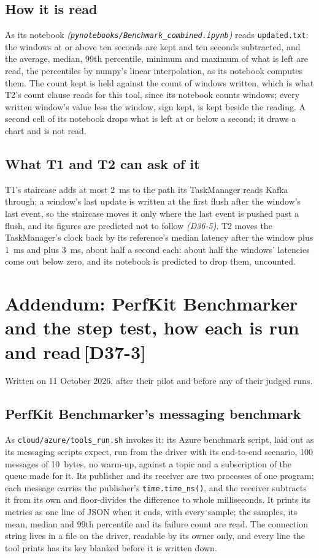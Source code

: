 \documentclass[11pt]{article}
\newcommand{\gl}[1]{{\color{soft}\itshape\small (#1)}}
\newcommand{\chgold}[1]{\,{\color{oldcol}\bfseries\footnotesize[#1]}}
\begin{document}
\subsection*{How it is read}
As its notebook \gl{\texttt{pynotebooks/Benchmark\_combined.ipynb}} reads \texttt{updated.txt}: the
windows at or above ten seconds are kept and ten seconds subtracted, and the average, median, 99th
percentile, minimum and maximum of what is left are read, the percentiles by numpy's linear
interpolation, as its notebook computes them. The count kept is held against the count of windows
written, which is what T2's count clause reads for this tool, since its notebook counts windows;
every written window's value less the window, sign kept, is kept beside the reading. A
second cell of its notebook drops what is left at or below a second; it draws a chart and is not
read.

\subsection*{What T1 and T2 can ask of it}
T1's staircase adds at most 2~ms to the path its TaskManager reads Kafka through; a window's last
update is written at the first flush after the window's last event, so the staircase moves it only
where the last event is pushed past a flush, and its figures are predicted not to follow
\gl{D36-5}. T2 moves the TaskManager's clock back by its reference's median latency after the window
plus 1~ms and plus 3~ms, about half a second each: about half the windows' latencies come out below
zero, and its notebook is predicted to drop them, uncounted.

\section[Addendum: PerfKit Benchmarker and the step test]{Addendum: PerfKit Benchmarker and the step test, how each is run and read\protect\chgold{D37-3}}\label{sec:addendum-s1}
Written on 11 October 2026, after their pilot and before any of their judged runs.

\subsection*{PerfKit Benchmarker's messaging benchmark}
As \texttt{cloud/azure/tools\_run.sh} invokes it: its Azure benchmark script, laid out as its
messaging scripts expect, run from the driver with its end-to-end scenario, 100 messages of
10~bytes, no warm-up, against a topic and a subscription of the queue made for it. Its publisher
and its receiver are two processes of one program; each message carries the publisher's
\texttt{time.time\_ns()}, and the receiver subtracts it from its own and floor-divides the
difference to whole milliseconds. It prints its metrics as one line of JSON when it ends, with
every sample; the samples, its mean, median and 99th percentile and its failure count are read.
The connection string lives in a file on the driver, readable by its owner only, and every line
the tool prints has its key blanked before it is written down.
\end{document}
